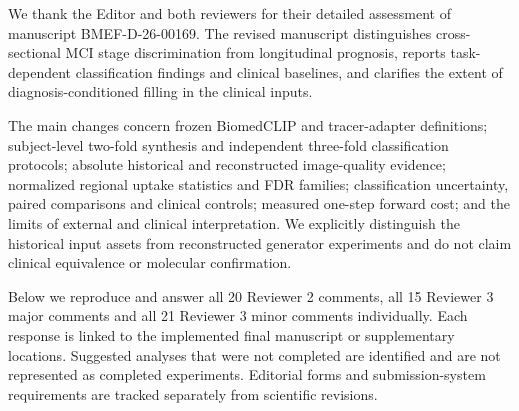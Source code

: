 We thank the Editor and both reviewers for their detailed assessment of manuscript BMEF-D-26-00169. The revised manuscript distinguishes cross-sectional MCI stage discrimination from longitudinal prognosis, reports task-dependent classification findings and clinical baselines, and clarifies the extent of diagnosis-conditioned filling in the clinical inputs.

The main changes concern frozen BiomedCLIP and tracer-adapter definitions; subject-level two-fold synthesis and independent three-fold classification protocols; absolute historical and reconstructed image-quality evidence; normalized regional uptake statistics and FDR families; classification uncertainty, paired comparisons and clinical controls; measured one-step forward cost; and the limits of external and clinical interpretation. We explicitly distinguish the historical input assets from reconstructed generator experiments and do not claim clinical equivalence or molecular confirmation.

Below we reproduce and answer all 20 Reviewer 2 comments, all 15 Reviewer 3 major comments and all 21 Reviewer 3 minor comments individually. Each response is linked to the implemented final manuscript or supplementary locations. Suggested analyses that were not completed are identified and are not represented as completed experiments. Editorial forms and submission-system requirements are tracked separately from scientific revisions.
